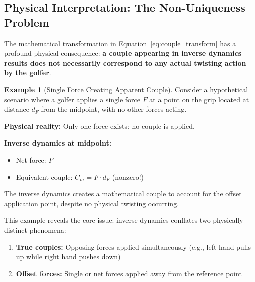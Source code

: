 \documentclass[11pt,a4paper]{article}
\theoremstyle{definition}
\newtheorem{example}{Example}[section]
\theoremstyle{plain}
\begin{document}
\subsection{Physical Interpretation: The Non-Uniqueness Problem}

The mathematical transformation in Equation~\ref{eq:couple_transform} has a profound physical consequence: \textbf{a couple appearing in inverse dynamics results does not necessarily correspond to any actual twisting action by the golfer}.

\begin{example}[Single Force Creating Apparent Couple]
Consider a hypothetical scenario where a golfer applies a single force $F$ at a point on the grip located at distance $d_F$ from the midpoint, with no other forces acting.

\textbf{Physical reality:} Only one force exists; no couple is applied.

\textbf{Inverse dynamics at midpoint:}
\begin{itemize}
    \item Net force: $F$
    \item Equivalent couple: $C_m = F \cdot d_F$ (nonzero!)
\end{itemize}

The inverse dynamics creates a mathematical couple to account for the offset application point, despite no physical twisting occurring.
\end{example}

This example reveals the core issue: inverse dynamics conflates two physically distinct phenomena:
\begin{enumerate}
    \item \textbf{True couples:} Opposing forces applied simultaneously (e.g., left hand pulls up while right hand pushes down)
    \item \textbf{Offset forces:} Single or net forces applied away from the reference point
\end{enumerate}
\end{document}
